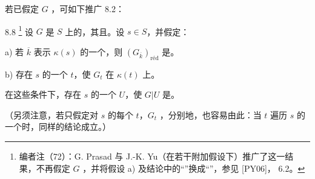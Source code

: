 若已假定 $G$ ，可如下推广 8.2：
\begin{SGAresult}{}{8.8}
\footnote{编者注（72）：G. Prasad 与 J.-K. Yu（在若干附加假设下）推广了这一结果，不再假定 $G$ ，并将假设 a) 及结论中的“”换成“”，参见 [PY06]， 6.2。} 设 $G$ 是 $S$ 上的，其且。设 $s\in S$，并假定：

a) 若 $\overline k$ 表示 $\kappa(s)$ 的一个，则 $(G_{\overline k})_{\mathrm{r\text{é}d}}$ 是。

b) 存在 $s$ 的一个 $t$，使 $G_t$ 在 $\kappa(t)$ 上。

在这些条件下，存在 $s$ 的一个 $U$，使 $G|U$ 是。
\end{SGAresult}
（另须注意，若只假定对 $s$ 的每个 $t$，$G_t$ ，分别地，也容易由此：当 $t$ 遍历 $s$ 的一个时，同样的结论成立。）
